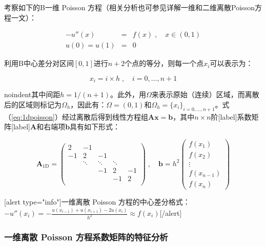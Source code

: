 \documentclass[12pt, UTF8, nofonts]{ctexart}
\begin{document}
考察如下的B一维 Poisson 方程（相关分析也可参见详解一维和二维离散Poisson方程一文）：

\begin{equation}
  \label{eq:1dpoisson}
  \begin{array}{ccl}
    -u''(x) &=& f(x) \;,\quad x \in (0,1) \\
    u(0) = u(1) &=& 0
  \end{array}
\end{equation}

利用B中心差分对区间$[0,1]$进行$n+2$个点的等分，则每一个点$x_i$可以表示为：

\begin{equation}
  \label{eq:}
  x_i=i \times h \;,\quad i=0,\ldots,n+1
\end{equation}

noindent其中间距$h=1/(n+1)$。此外，用$\Omega$来表示原始（连续）区域，而离散后的区域则标记为$\Omega_{h}$，因此有：$\Omega=(0,1)$和$\Omega_h=\{x_i\}_{i=0,\ldots,n+1}$。式（\ref{eq:1dpoisson}）经过离散后得到线性方程组$\boldsymbol{Ax}=\boldsymbol{b}$，其中$n \times n$阶[label]系数矩阵[label]$\boldsymbol{A}$和右端项$\boldsymbol{b}$具有如下形式：

\begin{equation*}
  \boldsymbol{A}_{\mathrm{1D}} =
  \begin{pmatrix}
    2 & -1 & & & \\
    -1 & 2 & -1 & & \\
    & \ddots & \ddots & \ddots & \\
    & & -1 & 2 & -1 \\
    & & & -1 & 2 \\
  \end{pmatrix} \;,\quad
  \boldsymbol{b} = h^2
  \begin{pmatrix}
    f(x_1) \\ f(x_2) \\ \vdots \\ f(x_{n-1}) \\ f(x_n)
  \end{pmatrix}
\end{equation*}

[alert type="info"]一维离散 Poisson 方程的中心差分格式：$-u''(x_i) = -\frac{u(x_{i-1})+u(x_{i+1})-2u(x_i)}{h^2} \approx f(x_i)$[/alert]

\subsubsection*{一维离散 Poisson 方程系数矩阵的特征分析}
\end{document}
